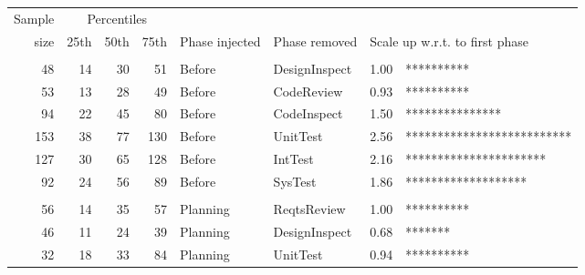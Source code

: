 \documentclass{sig-alternate}
\def\baselinestretch{1}
\begin{document}
\begin{figure}[!t] 
 \renewcommand{\baselinestretch}{0.7}
 \scriptsize
\begin{center}
\begin{tabular}{r|rrr|ll|rl}  %
  Sample&\multicolumn{3}{c|}{Percentiles}\\ 
size & 25th & 50th & 75th & Phase injected & Phase removed & \multicolumn{2}{l}{Scale up w.r.t. to first phase}\\\hline
\\
 48&   14&   30&   51&Before&DesignInspect &1.00 & **********  \\
 53&   13&   28&   49&Before&CodeReview &0.93 & **********  \\
 94&   22&   45&   80&Before&CodeInspect &1.50 & ***************  \\
153&   38&   77&  130&Before&UnitTest &2.56 & **************************  \\
127&   30&   65&  128&Before&IntTest &2.16 & **********************  \\
 92&   24&   56&   89&Before&SysTest &1.86 & *******************  \\
 
 
\\
 56&   14&   35&   57&Planning&ReqtsReview &1.00 & **********  \\
 46&   11&   24&   39&Planning&DesignInspect &0.68 & *******  \\
 32&   18&   33&   84&Planning&UnitTest &0.94 & **********  \\
 

\end{tabular}
\end{center}
\end{figure}
\end{document}
